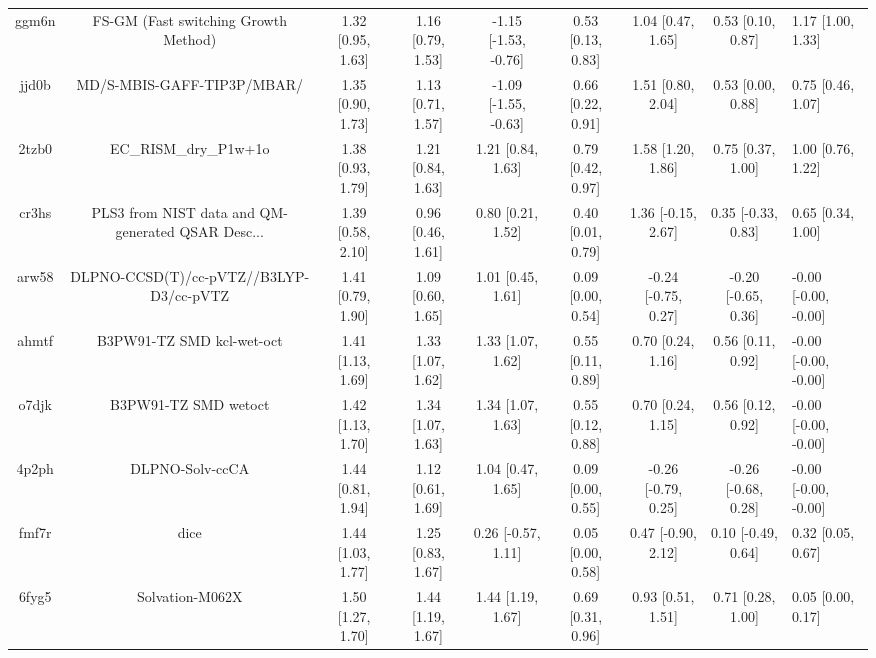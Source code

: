 \documentclass{article}
\begin{document}
\begin{center}
\begin{longtable}{|cccccccc|}
 ggm6n &               FS-GM (Fast switching Growth Method) &  1.32 [0.95, 1.63] &  1.16 [0.79, 1.53] &  -1.15 [-1.53, -0.76] &  0.53 [0.13, 0.83] &    1.04 [0.47, 1.65] &    0.53 [0.10, 0.87] &     1.17 [1.00, 1.33] \\
 jjd0b &                         MD/S-MBIS-GAFF-TIP3P/MBAR/ &  1.35 [0.90, 1.73] &  1.13 [0.71, 1.57] &  -1.09 [-1.55, -0.63] &  0.66 [0.22, 0.91] &    1.51 [0.80, 2.04] &    0.53 [0.00, 0.88] &     0.75 [0.46, 1.07] \\
 2tzb0 &                              EC\_RISM\_dry\_P1w+1o &  1.38 [0.93, 1.79] &  1.21 [0.84, 1.63] &     1.21 [0.84, 1.63] &  0.79 [0.42, 0.97] &    1.58 [1.20, 1.86] &    0.75 [0.37, 1.00] &     1.00 [0.76, 1.22] \\
 cr3hs &  PLS3 from NIST data and QM-generated QSAR Desc... &  1.39 [0.58, 2.10] &  0.96 [0.46, 1.61] &     0.80 [0.21, 1.52] &  0.40 [0.01, 0.79] &   1.36 [-0.15, 2.67] &   0.35 [-0.33, 0.83] &     0.65 [0.34, 1.00] \\
 arw58 &            DLPNO-CCSD(T)/cc-pVTZ//B3LYP-D3/cc-pVTZ &  1.41 [0.79, 1.90] &  1.09 [0.60, 1.65] &     1.01 [0.45, 1.61] &  0.09 [0.00, 0.54] &  -0.24 [-0.75, 0.27] &  -0.20 [-0.65, 0.36] &  -0.00 [-0.00, -0.00] \\
 ahmtf &                          B3PW91-TZ SMD kcl-wet-oct &  1.41 [1.13, 1.69] &  1.33 [1.07, 1.62] &     1.33 [1.07, 1.62] &  0.55 [0.11, 0.89] &    0.70 [0.24, 1.16] &    0.56 [0.11, 0.92] &  -0.00 [-0.00, -0.00] \\
 o7djk &                               B3PW91-TZ SMD wetoct &  1.42 [1.13, 1.70] &  1.34 [1.07, 1.63] &     1.34 [1.07, 1.63] &  0.55 [0.12, 0.88] &    0.70 [0.24, 1.15] &    0.56 [0.12, 0.92] &  -0.00 [-0.00, -0.00] \\
 4p2ph &                                    DLPNO-Solv-ccCA &  1.44 [0.81, 1.94] &  1.12 [0.61, 1.69] &     1.04 [0.47, 1.65] &  0.09 [0.00, 0.55] &  -0.26 [-0.79, 0.25] &  -0.26 [-0.68, 0.28] &  -0.00 [-0.00, -0.00] \\
 fmf7r &                                               dice &  1.44 [1.03, 1.77] &  1.25 [0.83, 1.67] &    0.26 [-0.57, 1.11] &  0.05 [0.00, 0.58] &   0.47 [-0.90, 2.12] &   0.10 [-0.49, 0.64] &     0.32 [0.05, 0.67] \\
 6fyg5 &                                    Solvation-M062X &  1.50 [1.27, 1.70] &  1.44 [1.19, 1.67] &     1.44 [1.19, 1.67] &  0.69 [0.31, 0.96] &    0.93 [0.51, 1.51] &    0.71 [0.28, 1.00] &     0.05 [0.00, 0.17] \\

\end{longtable}
\end{center}
\end{document}
